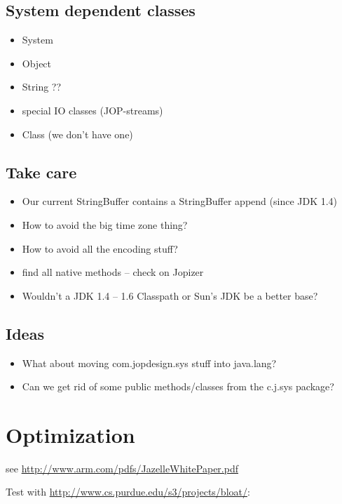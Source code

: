 \documentclass[a4paper,12pt]{scrartcl}
\begin{document}
\subsection{System dependent classes}

\begin{itemize}
  \item System
  \item Object
  \item String ??
  \item special IO classes (JOP-streams)
  \item Class (we don't have one)
\end{itemize}

\subsection{Take care}

\begin{itemize}
  \item Our current StringBuffer contains a StringBuffer append
      (since JDK 1.4)
  \item How to avoid the big time zone thing?
  \item How to avoid all the encoding stuff?
  \item find all native methods -- check on Jopizer
  \item Wouldn't a JDK 1.4 -- 1.6 Classpath or Sun's JDK be a
      better base?
\end{itemize}

\subsection{Ideas}

\begin{itemize}
  \item What about moving com.jopdesign.sys stuff into java.lang?
  \item Can we get rid of some public methods/classes from the
      c.j.sys package?
\end{itemize}



\section{Optimization}

see \url{http://www.arm.com/pdfs/JazelleWhitePaper.pdf}

Test with \url{http://www.cs.purdue.edu/s3/projects/bloat/}:
\end{document}
